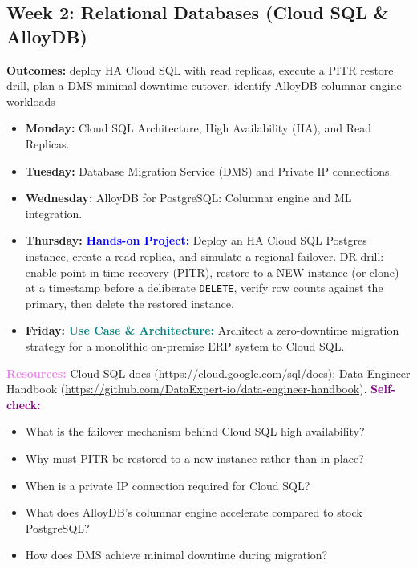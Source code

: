 \documentclass[11pt, a4paper]{article}
\newcommand{\project}[1]{\vspace{1mm}\noindent\textbf{\textcolor{blue}{Hands-on Project:}} #1}
\newcommand{\usecase}[1]{\vspace{1mm}\noindent\textbf{\textcolor{teal}{Use Case \& Architecture:}} #1}
\newcommand{\dayitem}[2]{\item \textbf{#1:} #2}
\newcommand{\resources}[1]{\vspace{1mm}\noindent\textbf{\textcolor{violet}{Resources:}} #1}
\newcommand{\selfcheck}[1]{\vspace{1mm}\noindent\textbf{\textcolor{purple}{Self-check:}} #1}
\begin{document}
\subsection*{Week 2: Relational Databases (Cloud SQL \& AlloyDB)}
\par\noindent\textbf{Outcomes:} deploy HA Cloud SQL with read replicas, execute a PITR restore drill, plan a DMS minimal-downtime cutover, identify AlloyDB columnar-engine workloads
\begin{itemize}[label=-]
    \dayitem{Monday}{Cloud SQL Architecture, High Availability (HA), and Read Replicas.}
    \dayitem{Tuesday}{Database Migration Service (DMS) and Private IP connections.}
    \dayitem{Wednesday}{AlloyDB for PostgreSQL: Columnar engine and ML integration.}
    \dayitem{Thursday}{\project{Deploy an HA Cloud SQL Postgres instance, create a read replica, and simulate a regional failover. DR drill: enable point-in-time recovery (PITR), restore to a NEW instance (or clone) at a timestamp before a deliberate \texttt{DELETE}, verify row counts against the primary, then delete the restored instance.}}
    \dayitem{Friday}{\usecase{Architect a zero-downtime migration strategy for a monolithic on-premise ERP system to Cloud SQL.}}
\end{itemize}
\resources{Cloud SQL docs (\url{https://cloud.google.com/sql/docs}); Data Engineer Handbook (\url{https://github.com/DataExpert-io/data-engineer-handbook}).}
\selfcheck{\begin{itemize}[label=-, nosep, leftmargin=1.5em]
    \item What is the failover mechanism behind Cloud SQL high availability?
    \item Why must PITR be restored to a new instance rather than in place?
    \item When is a private IP connection required for Cloud SQL?
    \item What does AlloyDB's columnar engine accelerate compared to stock PostgreSQL?
    \item How does DMS achieve minimal downtime during migration?
\end{itemize}}
\end{document}
